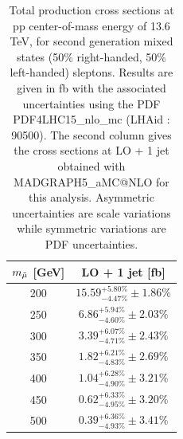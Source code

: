 \documentclass{cernatlasnote}
\begin{document}
\begin{table}
    \centering
    \begin{tabular}{ | c | c |}
        \hline
        \rowcolor{lightgray} 
         $m_{\Tilde{\mu}}$ [GeV] &  LO + 1 jet [fb]\\
         \hline
         200  & $15.59^{+5.80\%}_{-4.47\%} \pm 1.86\%$  \\
         \hline
         250   & $6.86^{+5.94\%}_{-4.60\%} \pm 2.03\%$ \\
         \hline
         300  & $3.39^{+6.07\%}_{-4.71\%} \pm 2.43\%$ \\
         \hline
         350 &  $1.82^{+6.21\%}_{-4.83\%} \pm 2.69\%$\\
         \hline
         400  & $1.04^{+6.28\%}_{-4.90\%} \pm 3.21\%$ \\
         \hline
         450  & $0.62^{+6.33\%}_{-4.95\%} \pm 3.20\%$ \\
         \hline
         500  & $0.39^{+6.36\%}_{-4.93\%} \pm 3.41\%$ \\
         \hline
    \end{tabular}
    \caption{Total production cross sections at pp center-of-mass energy of 13.6 TeV, for second generation mixed states (50\% right-handed, 50\% left-handed) sleptons. Results are given in fb with the associated uncertainties using the PDF PDF4LHC15\_nlo\_mc (LHAid : 90500). The second column gives the cross sections at LO + 1 jet obtained with MADGRAPH5\_aMC@NLO for this analysis. Asymmetric uncertainties are scale variations while symmetric variations are PDF uncertainties.} 
    \label{tab:RLLRXS13p6}
\end{table}
\end{document}
